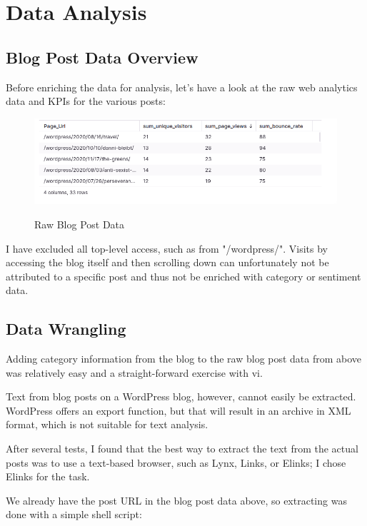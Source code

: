 %
%

\pagebreak
\section{Data Analysis}

\onehalfspacing

\subsection{Blog Post Data Overview}

Before enriching the data for analysis, let's have a look at the raw web analytics data and KPIs for the various posts:

\begin{figure}[H]
\centering
\caption {Raw Blog Post Data}
\includegraphics[width=\linewidth]{images/analysis-raw.png}
\label{fig:analysisRaw}
\end{figure}

I have excluded all top-level access, such as from "/wordpress/". Visits by accessing the blog itself and then scrolling down can unfortunately not be attributed to a specific post and thus not be enriched with category or sentiment data.

\subsection{Data Wrangling}

Adding category information from the blog to the raw blog post data from above was relatively easy and a straight-forward exercise with vi.

Text from blog posts on a WordPress blog, however, cannot easily be extracted. WordPress offers an export function, but that will result in an archive in XML format, which is not suitable for text analysis.

After several tests, I found that the best way to extract the text from the actual posts was to use a text-based browser, such as Lynx, Links, or Elinks; I chose Elinks for the task.

We already have the post URL in the blog post data above, so extracting was done with a simple shell script:

